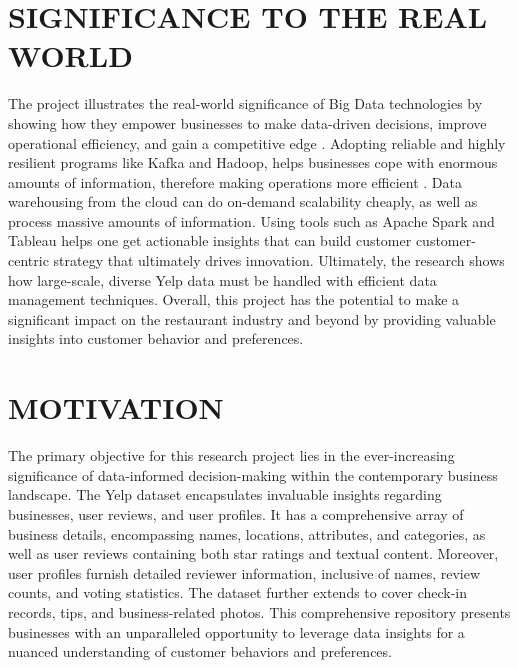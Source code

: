 \documentclass[conference]{IEEEtran}
\begin{document}

\section{SIGNIFICANCE TO THE REAL WORLD}
The project illustrates the real-world significance of Big Data technologies by showing how they empower businesses to make data-driven decisions, improve operational efficiency, and gain a competitive edge \cite{analytics}. Adopting reliable and highly resilient programs like Kafka and Hadoop, helps businesses cope with enormous amounts of information, therefore making operations more efficient \cite{agnee} \cite{mapreduce}. Data warehousing from the cloud can do on-demand scalability cheaply, as well as process massive amounts of information. Using tools such as Apache Spark and Tableau helps one get actionable insights that can build customer customer-centric strategy that ultimately drives innovation. Ultimately, the research shows how large-scale, diverse Yelp data must be handled with efficient data management techniques.  Overall, this project has the potential to make a significant impact on the restaurant industry and beyond by providing valuable insights into customer behavior and preferences.



\section{MOTIVATION}
The primary objective for this research project lies in the ever-increasing significance of data-informed decision-making within the contemporary business landscape. The Yelp dataset encapsulates invaluable insights regarding businesses, user reviews, and user profiles. It has a comprehensive array of business details, encompassing names, locations, attributes, and categories, as well as user reviews containing both star ratings and textual content. Moreover, user profiles furnish detailed reviewer information, inclusive of names, review counts, and voting statistics. The dataset further extends to cover check-in records, tips, and business-related photos. This comprehensive repository presents businesses with an unparalleled opportunity to leverage data insights for a nuanced understanding of customer behaviors and preferences.


\end{document}
